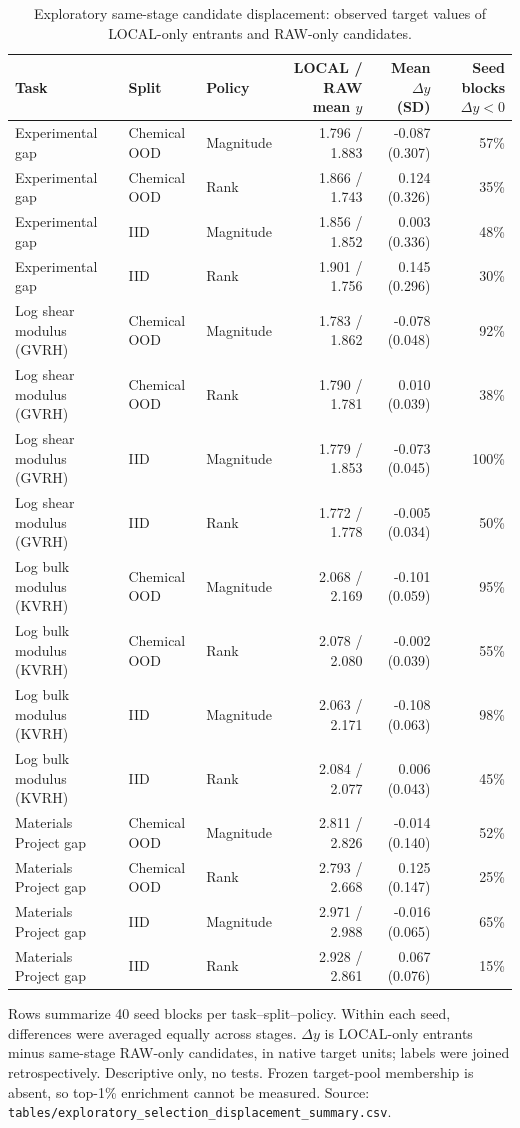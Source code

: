 \begin{table}[!ht]
\centering
\caption{Exploratory same-stage candidate displacement: observed target values of LOCAL-only entrants and RAW-only candidates.}
\label{tab:selection_displacement}
\scriptsize
\setlength{\tabcolsep}{3pt}
\begin{tabularx}{\linewidth}{>{\naggedright\arraybackslash}Xllrrr}
\toprule
Task & Split & Policy & LOCAL / RAW mean $y$ & Mean $\Delta y$ (SD) & Seed blocks $\Delta y<0$\\
\midrule
Experimental gap & Chemical OOD & Magnitude & 1.796 / 1.883 & -0.087 (0.307) & 57\%\\
Experimental gap & Chemical OOD & Rank & 1.866 / 1.743 & 0.124 (0.326) & 35\%\\
Experimental gap & IID & Magnitude & 1.856 / 1.852 & 0.003 (0.336) & 48\%\\
Experimental gap & IID & Rank & 1.901 / 1.756 & 0.145 (0.296) & 30\%\\
Log shear modulus (GVRH) & Chemical OOD & Magnitude & 1.783 / 1.862 & -0.078 (0.048) & 92\%\\
Log shear modulus (GVRH) & Chemical OOD & Rank & 1.790 / 1.781 & 0.010 (0.039) & 38\%\\
Log shear modulus (GVRH) & IID & Magnitude & 1.779 / 1.853 & -0.073 (0.045) & 100\%\\
Log shear modulus (GVRH) & IID & Rank & 1.772 / 1.778 & -0.005 (0.034) & 50\%\\
Log bulk modulus (KVRH) & Chemical OOD & Magnitude & 2.068 / 2.169 & -0.101 (0.059) & 95\%\\
Log bulk modulus (KVRH) & Chemical OOD & Rank & 2.078 / 2.080 & -0.002 (0.039) & 55\%\\
Log bulk modulus (KVRH) & IID & Magnitude & 2.063 / 2.171 & -0.108 (0.063) & 98\%\\
Log bulk modulus (KVRH) & IID & Rank & 2.084 / 2.077 & 0.006 (0.043) & 45\%\\
Materials Project gap & Chemical OOD & Magnitude & 2.811 / 2.826 & -0.014 (0.140) & 52\%\\
Materials Project gap & Chemical OOD & Rank & 2.793 / 2.668 & 0.125 (0.147) & 25\%\\
Materials Project gap & IID & Magnitude & 2.971 / 2.988 & -0.016 (0.065) & 65\%\\
Materials Project gap & IID & Rank & 2.928 / 2.861 & 0.067 (0.076) & 15\%\\
\bottomrule
\end{tabularx}
\begin{flushleft}\footnotesize Rows summarize 40 seed blocks per task--split--policy. Within each seed, differences were averaged equally across stages. $\Delta y$ is LOCAL-only entrants minus same-stage RAW-only candidates, in native target units; labels were joined retrospectively. Descriptive only, no tests. Frozen target-pool membership is absent, so top-1\% enrichment cannot be measured. Source: \texttt{tables/exploratory\_selection\_displacement\_summary.csv}.\end{flushleft}
\end{table}
